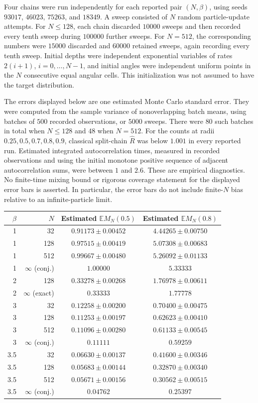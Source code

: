 \documentclass[11pt,a4paper]{article}
\numberwithin{equation}{section}
\theoremstyle{definition}
\theoremstyle{remark}
\begin{document}
Four chains were run independently for each reported pair $(N,\beta)$,
using seeds $93017$, $46023$, $75263$, and $18349$.
A sweep consisted of $N$ random particle-update attempts.
For $N\le128$, each chain discarded $10000$ sweeps and then recorded every
tenth sweep during $100000$ further sweeps.  For $N=512$, the corresponding
numbers were $15000$ discarded and $60000$ retained sweeps, again recording
every tenth sweep.  Initial depths were independent exponential variables
of rates $2(i+1)$, $i=0,\ldots,N-1$, and initial angles were independent
uniform points in the $N$ consecutive equal angular cells.  This
initialization was not assumed to have the target distribution.

The errors displayed below are one estimated Monte Carlo standard error.
They were computed from the sample variance of nonoverlapping batch means,
using batches of $500$ recorded observations, or $5000$ sweeps.  There were
$80$ such batches in total when $N\le128$ and $48$ when $N=512$.
For the counts at radii $0.25,0.5,0.7,0.8,0.9$, classical split-chain
$\widehat R$ was below $1.001$ in every reported run.  Estimated integrated
autocorrelation times, measured in recorded observations and using the initial
monotone positive sequence of adjacent autocorrelation sums, were between
$1$ and $2.6$.
These are empirical diagnostics.  No finite-time mixing bound or rigorous
coverage statement for the displayed error bars is asserted.
In particular, the error bars do not include finite-$N$ bias relative to an
infinite-particle limit.

\begin{center}
\small
\begin{tabular}{rrcc}
\hline
$\beta$ & $N$ & Estimated $\mathbb E M_N(0.5)$ & Estimated $\mathbb E M_N(0.8)$\\
\hline
1 & 32 & $0.91173\pm 0.00452$ & $4.44265\pm 0.00750$ \\
1 & 128 & $0.97515\pm 0.00419$ & $5.07308\pm 0.00683$ \\
1 & 512 & $0.99667\pm 0.00480$ & $5.26092\pm 0.01133$ \\
1 & $\infty$ (conj.) & $1.00000$ & $5.33333$ \\\hline
2 & 128 & $0.33278\pm 0.00268$ & $1.76978\pm 0.00611$ \\
2 & $\infty$ (exact) & $0.33333$ & $1.77778$ \\\hline
3 & 32 & $0.12258\pm 0.00200$ & $0.70400\pm 0.00475$ \\
3 & 128 & $0.11253\pm 0.00197$ & $0.62623\pm 0.00410$ \\
3 & 512 & $0.11096\pm 0.00280$ & $0.61133\pm 0.00545$ \\
3 & $\infty$ (conj.) & $0.11111$ & $0.59259$ \\\hline
3.5 & 32 & $0.06630\pm 0.00137$ & $0.41600\pm 0.00346$ \\
3.5 & 128 & $0.05683\pm 0.00144$ & $0.32870\pm 0.00340$ \\
3.5 & 512 & $0.05671\pm 0.00156$ & $0.30562\pm 0.00515$ \\
3.5 & $\infty$ (conj.) & $0.04762$ & $0.25397$ \\\hline
\end{tabular}
\end{center}
\end{document}
